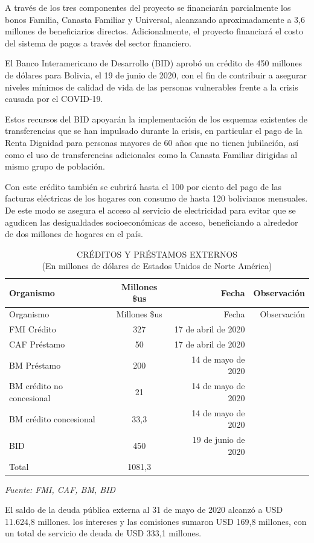 \documentclass[a4paper, nobind]{templates/ociamthesis}
\begin{document}
A través de los tres componentes del proyecto se financiarán parcialmente los bonos Familia, Canasta Familiar y Universal, alcanzando aproximadamente a 3,6 millones de beneficiarios directos. Adicionalmente, el proyecto financiará el costo del sistema de pagos a través del sector financiero.

El Banco Interamericano de Desarrollo (BID) aprobó un crédito de 450 millones de dólares para Bolivia, el 19 de junio de 2020, con el fin de contribuir a asegurar niveles mínimos de calidad de vida de las personas vulnerables frente a la crisis causada por el COVID-19.

Estos recursos del BID apoyarán la implementación de los esquemas existentes de transferencias que se han impulsado durante la crisis, en particular el pago de la Renta Dignidad para personas mayores de 60 años que no tienen jubilación, así como el uso de transferencias adicionales como la Canasta Familiar dirigidas al mismo grupo de población.

Con este crédito también se cubrirá hasta el 100 por ciento del pago de las facturas eléctricas de los hogares con consumo de hasta 120 bolivianos mensuales. De este modo se asegura el acceso al servicio de electricidad para evitar que se agudicen las desigualdades socioeconómicas de acceso, beneficiando a alrededor de dos millones de hogares en el país.

\begin{longtable}[]{@{}lcrr@{}}
\caption{CRÉDITOS Y PRÉSTAMOS EXTERNOS\\
(En millones de dólares de Estados Unidos de Norte América)}\tabularnewline
\toprule
Organismo & Millones \$us & Fecha & Observación\tabularnewline
\midrule
\endfirsthead
\toprule
Organismo & Millones \$us & Fecha & Observación\tabularnewline
\midrule
\endhead
FMI Crédito & 327 & 17 de abril de 2020 &\tabularnewline
CAF Préstamo & 50 & 17 de abril de 2020 &\tabularnewline
BM Préstamo & 200 & 14 de mayo de 2020 &\tabularnewline
BM crédito no concesional & 21 & 14 de mayo de 2020 &\tabularnewline
BM crédito concesional & 33,3 & 14 de mayo de 2020 &\tabularnewline
BID & 450 & 19 de junio de 2020 &\tabularnewline
Total & 1081,3 & &\tabularnewline
\bottomrule
\end{longtable}

\emph{Fuente: FMI, CAF, BM, BID}

El saldo de la deuda pública externa al 31 de mayo de 2020 alcanzó a USD 11.624,8 millones. los intereses y las comisiones sumaron USD 169,8 millones, con un total de servicio de deuda de USD 333,1 millones.
\end{document}
